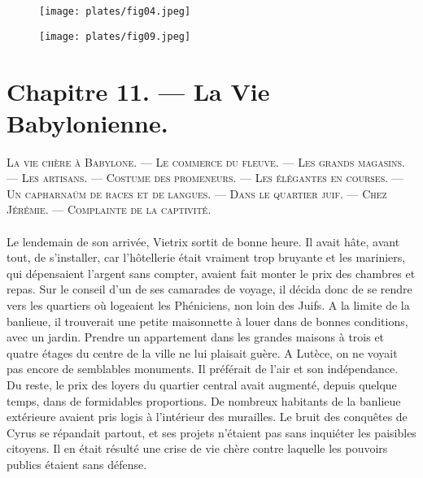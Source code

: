 \documentclass[a4paper, 11pt, oneside, polutonikogreek, french]{article}
\begin{document}
\begin{figure}[H]
\centering
\texttt{[image: plates/fig04.jpeg]}
\end{figure}
\clearpage
\begin{figure}[H]
\centering
\texttt{[image: plates/fig09.jpeg]}
\end{figure}
\section{Chapitre 11. --- La Vie Babylonienne.}
\begin{center}
\scshape
\small
La vie chère à Babylone. --- Le commerce du fleuve. --- Les grands magasins. --- Les artisans. --- Costume des promeneurs. --- Les élégantes en courses. --- Un capharnaüm de races et de langues. --- Dans le quartier juif. --- Chez Jérémie. --- Complainte de la captivité.
\end{center}
\paragraph{}
Le lendemain de son arrivée, Vietrix sortit de bonne heure. Il avait hâte, avant tout, de s'installer, car l'hôtellerie était vraiment trop bruyante et les mariniers, qui dépensaient l'argent sans compter, avaient fait monter le prix des chambres et repas. Sur le conseil d'un de ses camarades de voyage, il décida donc de se rendre vers les quartiers où logeaient les Phéniciens, non loin des Juifs. A la limite de la banlieue, il trouverait une petite maisonnette à louer dans de bonnes conditions, avec un jardin. Prendre un appartement dans les grandes maisons à trois et quatre étages du centre de la ville ne lui plaisait guère. A Lutèce, on ne voyait pas encore de semblables monuments. Il préférait de l'air et son indépendance. Du reste, le prix des loyers du quartier central avait augmenté, depuis quelque temps, dans de formidables proportions. De nombreux habitants de la banlieue extérieure avaient pris logis à l'intérieur des murailles. Le bruit des conquêtes de Cyrus se répandait partout, et ses projets n'étaient pas sans inquiéter les paisibles citoyens. Il en était résulté une crise de vie chère contre laquelle les pouvoirs publics étaient sans défense.

\centerline{\EightStarTaper}
\centerline{\EightStarTaper\EightStarTaper}
\bigskip
\end{document}
